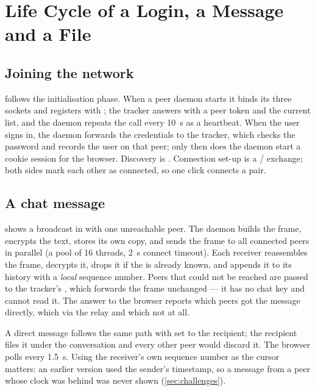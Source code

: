 \section{Life Cycle of a Login, a Message and a File}\label{sec:lifecycles}

\subsection{Joining the network}
 follows the initialisation phase. When a peer daemon starts it binds its three
sockets and registers with ; the tracker answers with a peer token and the current
list, and the daemon repeats the call every \SI{10}{s} as a heartbeat. When the user signs in, the
daemon forwards the credentials to the tracker, which checks the password and records the user on
that peer; only then does the daemon start a cookie session for the browser. Discovery is
. Connection set-up is a / exchange; both sides mark
each other as connected, so one click connects a pair.


\subsection{A chat message}
 shows a broadcast in  with one unreachable peer. The daemon
builds the frame, encrypts the text, stores its own copy, and sends the frame to all connected peers
in parallel (a pool of 16 threads, \SI{2}{s} connect timeout). Each receiver reassembles the frame,
decrypts it, drops it if the  is already known, and appends it to its history with a
\emph{local} sequence number. Peers that could not be reached are passed to the tracker's
, which forwards the frame unchanged --- it has no chat key and cannot read it. The
answer to the browser reports which peers got the message directly, which via the relay and which not
at all.


A direct message follows the same path with  set to the recipient; the recipient files it
under the conversation  and every other peer would discard it. The browser
polls  every \SI{1.5}{s}. Using the receiver's own sequence number as
the cursor matters: an earlier version used the sender's timestamp, so a message from a peer whose
clock was behind was never shown (\cref{sec:challenges}).

